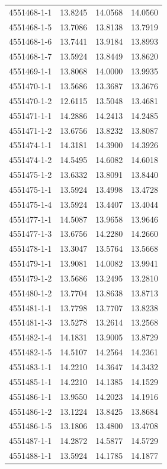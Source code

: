 \begin{longtable}{lrrr}
4551468-1-1 & 13.8245 & 14.0568 & 14.0560 \\
4551468-1-5 & 13.7086 & 13.8138 & 13.7919 \\
4551468-1-6 & 13.7441 & 13.9184 & 13.8993 \\
4551468-1-7 & 13.5924 & 13.8449 & 13.8620 \\
4551469-1-1 & 13.8068 & 14.0000 & 13.9935 \\
4551470-1-1 & 13.5686 & 13.3687 & 13.3676 \\
4551470-1-2 & 12.6115 & 13.5048 & 13.4681 \\
4551471-1-1 & 14.2886 & 14.2413 & 14.2485 \\
4551471-1-2 & 13.6756 & 13.8232 & 13.8087 \\
4551474-1-1 & 14.3181 & 14.3900 & 14.3926 \\
4551474-1-2 & 14.5495 & 14.6082 & 14.6018 \\
4551475-1-2 & 13.6332 & 13.8091 & 13.8440 \\
4551475-1-1 & 13.5924 & 13.4998 & 13.4728 \\
4551475-1-4 & 13.5924 & 13.4407 & 13.4044 \\
4551477-1-1 & 14.5087 & 13.9658 & 13.9646 \\
4551477-1-3 & 13.6756 & 14.2280 & 14.2660 \\
4551478-1-1 & 13.3047 & 13.5764 & 13.5668 \\
4551479-1-1 & 13.9081 & 14.0082 & 13.9941 \\
4551479-1-2 & 13.5686 & 13.2495 & 13.2810 \\
4551480-1-2 & 13.7704 & 13.8638 & 13.8713 \\
4551481-1-1 & 13.7798 & 13.7707 & 13.8238 \\
4551481-1-3 & 13.5278 & 13.2614 & 13.2568 \\
4551482-1-4 & 14.1831 & 13.9005 & 13.8729 \\
4551482-1-5 & 14.5107 & 14.2564 & 14.2361 \\
4551483-1-1 & 14.2210 & 14.3647 & 14.3432 \\
4551485-1-1 & 14.2210 & 14.1385 & 14.1529 \\
4551486-1-1 & 13.9550 & 14.2023 & 14.1916 \\
4551486-1-2 & 13.1224 & 13.8425 & 13.8684 \\
4551486-1-5 & 13.1806 & 13.4800 & 13.4708 \\
4551487-1-1 & 14.2872 & 14.5877 & 14.5729 \\
4551488-1-1 & 13.5924 & 14.1785 & 14.1877 \\

\end{longtable}

